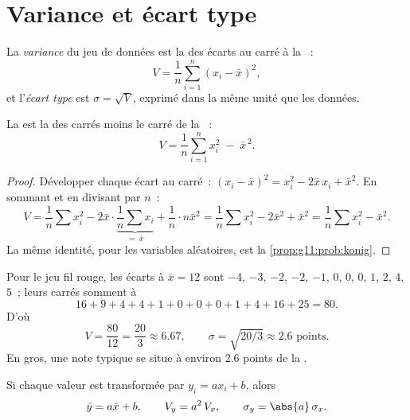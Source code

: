 \section{Variance et écart type}

\begin{definition}\label{def:g11:stat:variance}
La \emph{variance} du jeu de données est la  des
écarts au carré à la ~:
\[
V = \frac{1}{n}\sum_{i=1}^{n} (x_i - \bar x)^2,
\]
et l'\emph{écart type} est $\sigma = \sqrt{V}$, exprimé
dans la même unité que les données.
\end{definition}

\begin{proposition}\label{prop:g11:stat:shortcut}
La  est la  des carrés moins le carré de la ~:
\[
V = \frac{1}{n}\sum_{i=1}^{n} x_i^2 \;-\; \bar x^{\,2}.
\]
\end{proposition}

\begin{proof}
Développer chaque écart au carré~:
$(x_i - \bar x)^2 = x_i^2 - 2\bar x\, x_i + \bar x^2$. En sommant et en
divisant par $n$~:
\[
V = \frac1n \sum x_i^2 - 2\bar x \cdot \underbrace{\frac1n \sum
x_i}_{=\ \bar x} + \frac1n \cdot n\bar x^2
= \frac1n\sum x_i^2 - 2\bar x^2 + \bar x^2
= \frac1n\sum x_i^2 - \bar x^2 .
\]
La même identité, pour les variables aléatoires, est la
\cref{prop:g11:prob:konig}.
\end{proof}

\begin{example}\label{ex:g11:stat:variance}
Pour le jeu fil rouge, les écarts à $\bar x = 12$ sont $-4$, $-3$, $-2$,
$-2$, $-1$, $0$, $0$, $0$, $1$, $2$, $4$, $5$~; leurs carrés somment à
\[
16 + 9 + 4 + 4 + 1 + 0 + 0 + 0 + 1 + 4 + 16 + 25 = 80 .
\]
D'où
\[
V = \frac{80}{12} = \frac{20}{3} \approx 6.67,
\qquad
\sigma = \sqrt{20/3} \approx 2.6 \text{ points}.
\]
En gros, une note typique se situe à environ $2.6$ points de la .
\end{example}

\begin{proposition}\label{prop:g11:stat:affine}
Si chaque valeur est transformée par $y_i = a x_i + b$, alors
\[
\bar y = a \bar x + b,
\qquad
V_y = a^2\, V_x,
\qquad
\sigma_y = \abs{a}\,\sigma_x .
\]
\end{proposition}

